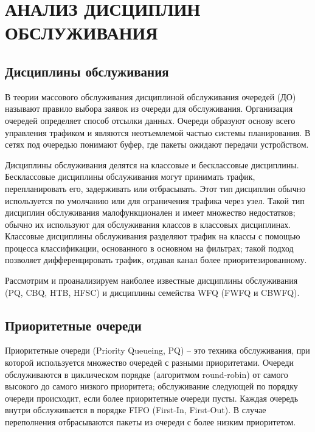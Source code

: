 \section{АНАЛИЗ ДИСЦИПЛИН ОБСЛУЖИВАНИЯ}

    \subsection{Дисциплины обслуживания}

	В теории массового обслуживания дисциплиной обслуживания очередей (ДО) называют правило выбора заявок
	из очереди для обслуживания\cite{Aliev}. Организация очередей
	определяет способ отсылки данных. Очереди образуют основу всего
	управления трафиком и являются неотъемлемой частью системы
	планирования. В сетях под очередью понимают буфер, где пакеты
	ожидают передачи устройством. \cite{trafficctl}

	Дисциплины обслуживания делятся на классовые и бесклассовые дисциплины.
	Бесклассовые дисциплины обслуживания могут принимать трафик,
	перепланировать его, задерживать или отбрасывать. Этот тип дисциплин
	обычно используется по умолчанию или для ограничения трафика через узел.
	Такой тип дисциплин обслуживания малофункционален и имеет множество недостатков;
	обычно их используют для обслуживания классов в классовых дисциплинах.
	Классовые дисциплины обслуживания разделяют трафик на классы с помощью
	процесса классификации, основанного в основном на фильтрах; такой подход
	позволяет дифференцировать трафик, отдавая канал более приоритезированному.\cite{lartc}

	Рассмотрим и проанализируем наиболее известные дисциплины обслуживания
	(PQ, CBQ, HTB, HFSC) и дисциплины семейства WFQ (FWFQ и CBWFQ).

    \subsection{Приоритетные очереди}

    Приоритетные очереди (Priority Queueing, PQ) -- это техника обслуживания,
    при которой используется множество очередей с разными приоритетами. Очереди
    обслуживаются в циклическом порядке (алгоритмом round-robin) от самого высокого 
    до самого низкого приоритета; обслуживание следующей по порядку очереди происходит,
    если более приоритетные очереди пусты. Каждая очередь внутри обслуживается в порядке FIFO
    (First-In, First-Out). В случае переполнения отбрасываются пакеты из очереди
    с более низким приоритетом.\cite{packethandling}
    
